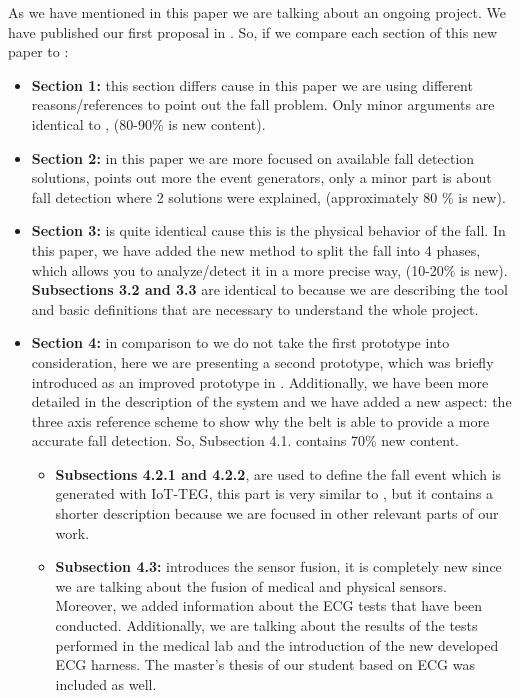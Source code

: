 \documentclass[parskip]{scrartcl}
\begin{document}
As we have mentioned in this paper we are talking about an ongoing project. We have published our first proposal in \cite{LorenaFall}. So, if we compare each section of this new paper to \cite{LorenaFall}:
\begin{itemize}
	\item \textbf{Section 1:} this section differs cause in this paper we are using  different reasons/references to point out the fall problem. Only minor arguments are identical to \cite{LorenaFall}, (80-90\% is new content).
	\item \textbf{Section 2:} in this paper we are more focused on available fall detection solutions, \cite{LorenaFall} points out more the event generators, only a minor part is about fall detection where 2 solutions were explained, (approximately 80 \% is new).
	\item \textbf{Section 3:} is quite identical cause this is the physical behavior of the fall. In this paper, we have added the new method to split the fall into 4 phases, which allows you to analyze/detect it in a more precise way, (10-20\% is new). \textbf{Subsections 3.2 and 3.3} are identical to \cite{LorenaFall} because we are describing the tool and basic definitions that are necessary to understand the whole project. 
	\item \textbf{Section 4:} in comparison to \cite{LorenaFall} we do not take the first prototype into consideration, here we are presenting a second prototype, which was briefly introduced as an improved prototype in \cite{LorenaFall}. Additionally, we have been more detailed in the description of the system and we have added a new aspect: the three axis reference scheme to show why the belt is able to provide a more accurate fall detection. So, Subsection 4.1. contains 70\% new content.
	\begin{itemize}
		\item \textbf{Subsections 4.2.1 and 4.2.2}, are used to define the fall event which is generated with IoT-TEG, this part is very similar to \cite{LorenaFall}, but it contains a shorter description because we are focused in other relevant parts of our work. 
		\item \textbf{Subsection 4.3:} introduces the sensor fusion, it is completely new since we are talking about the fusion of medical and physical sensors. Moreover, we added information about the ECG tests that have been conducted. Additionally, we are talking about the results of the tests performed in the medical lab and the introduction of the new developed ECG harness. The master's thesis of our student based on ECG was included as well. 

\end{itemize}
\end{itemize}
\end{document}

